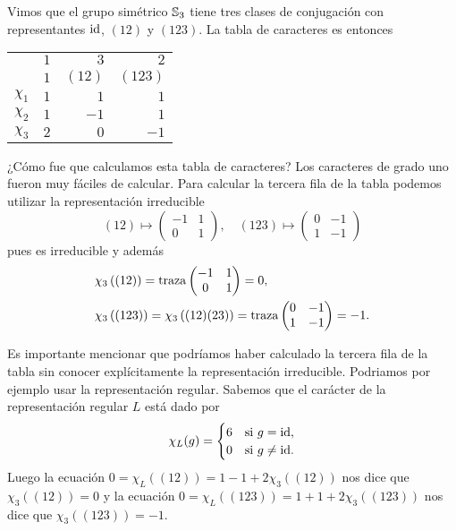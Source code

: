 \begin{example}
	Vimos que el grupo simétrico $\mathbb{S}_3$ tiene tres clases de conjugación 
	con representantes $\operatorname{id}$, $(12)$ y $(123)$. La tabla de caracteres es entonces
	\begin{center}
		\begin{tabular}{|c|rrr|}
			\hline
			& $1$ & $3$ & $2$\tabularnewline
			& $1$ & $(12)$ & $(123)$ \tabularnewline
			\hline 
			$\chi_{1}$ & $1$ & $1$ & $1$\tabularnewline
			$\chi_{2}$ & $1$ & $-1$ & $1$ \tabularnewline
			$\chi_{3}$ & $2$ & $0$ & $-1$ \tabularnewline
			\hline
		\end{tabular}
	\end{center}
	¿Cómo fue que calculamos esta tabla de caracteres? Los caracteres de grado
	uno fueron muy fáciles de calcular. Para calcular la tercera fila de la
	tabla podemos utilizar la representación irreducible 
	\[
	(12)\mapsto \begin{pmatrix}-1&1\\0&1\end{pmatrix},
	\quad
	(123)\mapsto \begin{pmatrix}0&-1\\1&-1\end{pmatrix}
	\]
	pues es irreducible y además 
	\begin{align*}
		&\chi_3\left( (12) \right)=\operatorname{traza}\begin{pmatrix}-1&1\\0&1\end{pmatrix}=0,\\
		&\chi_3\left( (123) \right)=\chi_3\left( (12)(23)\right)=\operatorname{traza}\begin{pmatrix}0&-1\\1&-1\end{pmatrix}=-1.
	\end{align*}

	Es importante mencionar que podríamos haber calculado la tercera fila de la
	tabla sin conocer explícitamente la representación irreducible. Podriamos
	por ejemplo usar la representación regular.  
	Sabemos que el carácter de la representación
	regular $L$ está dado por
	\[
		\chi_L(g)=\begin{cases}
			6 & \text{si $g=\operatorname{id}$},\\
			0 & \text{si $g\ne\operatorname{id}$}.
		\end{cases}
	\]
	Luego la ecuación $0=\chi_L\left( (12) \right)=1-1+2\chi_3( (12))$ nos dice
	que $\chi_3( (12))=0$ y la ecuación $0=\chi_L( (123))=1+1+2\chi_3( (123))$
	nos dice que $\chi_3\left( (123) \right)=-1$. 


\end{example}
